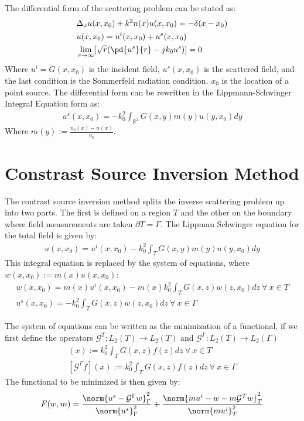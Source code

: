 \documentclass[14pt]{article}
\begin{document}
		The differential form of the scattering problem can be stated as:
			\begin{align}
				&\Delta_xu(x,x_0) + k^2n(x) u(x,x_0) = -\delta(x - x_0) \\
				&u(x,x_0) = u^i(x,x_0) + u^s(x,x_0) \\
				&\lim_{r \rightarrow \infty} [\sqrt{r}(\pd{u^s}{r} - jk_0u^s)] = 0 
			\end{align}
		Where $u^i = G(x,x_0)$ is the incident field, $u^s(x,x_0)$ is the scattered
		field, and the last condition is the Sommerfeld radiation condition.  $x_0$
		is the location of a point source.  The differential form can be rewritten
		in the Lippmann-Schwinger Integral Equation form as:
			\begin{align}
				u^s(x,x_0) = -k_0^2 \int_{\mathbb{R}^2} G(x,y) m(y)u(y,x_0) dy
			\end{align}
		Where $m(y) := \frac{n_b(x) - n(x)}{n_0}$.
	
	\section{Constrast Source Inversion Method}
		The contrast source inversion method splits the inverse scattering problem
	up into two parts.  The first is defined on a region $T$ and the other on the
	boundary where field measurements are taken $\partial T = \Gamma$.  The 
	Lippman Schwinger equation for the total field is given by:
		\begin{align}
			u(x,x_0) = u^i(x,x_0) - k_0^2 \int_T G(x,y) m(y)u(y,x_0) dy
		\end{align}
	This integral equation is replaced by the system of equations, where
	$w(x,x_0) := m(x)u(x,x_0)$:
		\begin{align}
			w(x,x_0) = m(x)u^i(x,x_0) - m(x) k_0^2 \int_T G(x,z)w(z,x_0) dz~\forall~x \in T \\
			u^s(x,x_0) = -k_0^2 \int_T G(x,z)w(z,x_0) dz~\forall~x \in \Gamma 
		\end{align}
			
	The system of equations can be written as the minimization of a functional,
	if we first define the operators $\mathcal{G}^T : L_2(T) \rightarrow L_2(T)$
	and $\mathcal{G}^{\Gamma} : L_2(T) \rightarrow L_2(\Gamma)$
		\begin{align}
			[\mathcal{G}^Tf](x) := k_0^2 \int_T G(x,z) f(z) dz~\forall~x\in T \\
			[\mathcal{G}^{\Gamma}f](x) := k_0^2 \int_T G(x,z) f(z) dz~\forall~x\in \Gamma 
		\end{align}
	The functional to be minimized is then given by:
		\begin{align}
			F(w,m) = \frac{\norm{u^s - \mathcal{G}^{\Gamma}w}_{\Gamma}^2}{\norm{u^s}_{\Gamma}^2} +
							 \frac{\norm{mu^i - w - m\mathcal{G}^Tw}_T^2}{\norm{mu^i}_T^2}
		\end{align}
\end{document}
